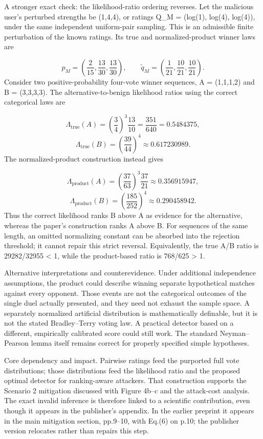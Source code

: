 \documentclass[10pt]{article}
\begin{document}
A stronger exact check: the likelihood-ratio ordering reverses. Let the malicious user’s perturbed strengths be (1,4,4), or ratings Q\_M = (log(1), log(4), log(4)), under the same independent uniform-pair sampling. This is an admissible finite perturbation of the known ratings. Its true and normalized-product winner laws are\par
\[p_M=\left(\frac2{15},\frac{13}{30},\frac{13}{30}\right),\qquad
\widetilde q_M=\left(\frac1{21},\frac{10}{21},\frac{10}{21}\right).\] Consider two positive-probability four-vote winner sequences, A = (1,1,1,2) and B = (3,3,3,3). The alternative-to-benign likelihood ratios using the correct categorical laws are\par
\[\Lambda_{\mathrm{true}}(A)=
\left(\frac34\right)^3\frac{13}{10}
=\frac{351}{640}=0.5484375,\] \[\Lambda_{\mathrm{true}}(B)=
\left(\frac{39}{44}\right)^4
\approx0.617230989.\] The normalized-product construction instead gives\par
\[\Lambda_{\mathrm{product}}(A)=
\left(\frac{37}{63}\right)^3\frac{37}{21}
\approx0.356915947,\] \[\Lambda_{\mathrm{product}}(B)=
\left(\frac{185}{252}\right)^4
\approx0.290458942.\] Thus the correct likelihood ranks B above A as evidence for the alternative, whereas the paper’s construction ranks A above B. For sequences of the same length, an omitted normalizing constant can be absorbed into the rejection threshold; it cannot repair this strict reversal. Equivalently, the true A/B ratio is 29282/32955 < 1, while the product-based ratio is 768/625 > 1.\par
Alternative interpretations and counterevidence. Under additional independence assumptions, the product could describe winning separate hypothetical matches against every opponent. Those events are not the categorical outcomes of the single duel actually presented, and they need not exhaust the sample space. A separately normalized artificial distribution is mathematically definable, but it is not the stated Bradley–Terry voting law. A practical detector based on a different, empirically calibrated score could still work. The standard Neyman–Pearson lemma itself remains correct for properly specified simple hypotheses.\par
Core dependency and impact. Pairwise ratings feed the purported full vote distributions; those distributions feed the likelihood ratio and the proposed optimal detector for ranking-aware attackers. That construction supports the Scenario 2 mitigation discussed with Figure 4b–c and the attack-cost analysis. The exact invalid inference is therefore linked to a scientific contribution, even though it appears in the publisher’s appendix. In the earlier preprint it appears in the main mitigation section, pp.9–10, with Eq.(6) on p.10; the publisher version relocates rather than repairs this step.\par
\end{document}
